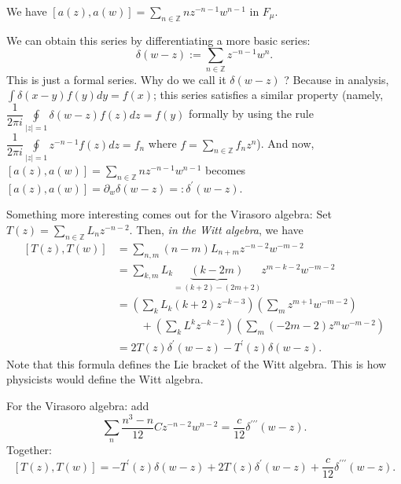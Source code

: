 \documentclass
[numbers=enddot,12pt,final,onecolumn,german,notitlepage]{scrartcl}%
\theoremstyle{definition}
\begin{document}
We have $\left[  a\left(  z\right)  ,a\left(  w\right)  \right]
=\sum\limits_{n\in\mathbb{Z}}nz^{-n-1}w^{n-1}$ in $F_{\mu}$.

We can obtain this series by differentiating a more basic series:%
\[
\delta\left(  w-z\right)  :=\sum_{n\in\mathbb{Z}}z^{-n-1}w^{n}.
\]
This is just a formal series. Why do we call it $\delta\left(  w-z\right)  $ ?
Because in analysis, $\int\delta\left(  x-y\right)  f\left(  y\right)
dy=f\left(  x\right)  $; this series satisfies a similar property (namely,
$\dfrac{1}{2\pi i}\oint\limits_{\left\vert z\right\vert =1}\delta\left(
w-z\right)  f\left(  z\right)  dz=f\left(  y\right)  $ formally by using the
rule $\dfrac{1}{2\pi i}\oint\limits_{\left\vert z\right\vert =1}%
z^{-n-1}f\left(  z\right)  dz=f_{n}$ where $f=\sum\limits_{n\in\mathbb{Z}%
}f_{n}z^{n}$). And now, $\left[  a\left(  z\right)  ,a\left(  w\right)
\right]  =\sum\limits_{n\in\mathbb{Z}}nz^{-n-1}w^{n-1}$ becomes $\left[
a\left(  z\right)  ,a\left(  w\right)  \right]  =\partial_{w}\delta\left(
w-z\right)  =:\delta^{\prime}\left(  w-z\right)  $.

Something more interesting comes out for the Virasoro algebra: Set $T\left(
z\right)  =\sum\limits_{n\in\mathbb{Z}}L_{n}z^{-n-2}$. Then, \textit{in the
Witt algebra}, we have%
\begin{align*}
\left[  T\left(  z\right)  ,T\left(  w\right)  \right]   &  =\sum
\limits_{n,m}\left(  n-m\right)  L_{n+m}z^{-n-2}w^{-m-2}\\
&  =\sum_{k,m}L_{k}\underbrace{\left(  k-2m\right)  }_{=\left(  k+2\right)
-\left(  2m+2\right)  }z^{m-k-2}w^{-m-2}\\
&  =\left(  \sum_{k}L_{k}\left(  k+2\right)  z^{-k-3}\right)  \left(  \sum
_{m}z^{m+1}w^{-m-2}\right) \\
&  \ \ \ \ \ \ \ \ \ \ +\left(  \sum_{k}L^{k}z^{-k-2}\right)  \left(  \sum
_{m}\left(  -2m-2\right)  z^{m}w^{-m-2}\right) \\
&  =2T\left(  z\right)  \delta^{\prime}\left(  w-z\right)  -T^{\prime}\left(
z\right)  \delta\left(  w-z\right)  .
\end{align*}
Note that this formula defines the Lie bracket of the Witt algebra. This is
how physicists would define the Witt algebra.

For the Virasoro algebra: add%
\[
\sum_{n}\dfrac{n^{3}-n}{12}Cz^{-n-2}w^{n-2}=\dfrac{c}{12}\delta^{\prime
\prime\prime}\left(  w-z\right)  .
\]
Together:%
\[
\left[  T\left(  z\right)  ,T\left(  w\right)  \right]  =-T^{\prime}\left(
z\right)  \delta\left(  w-z\right)  +2T\left(  z\right)  \delta^{\prime
}\left(  w-z\right)  +\dfrac{c}{12}\delta^{\prime\prime\prime}\left(
w-z\right)  .
\]
\end{document}

